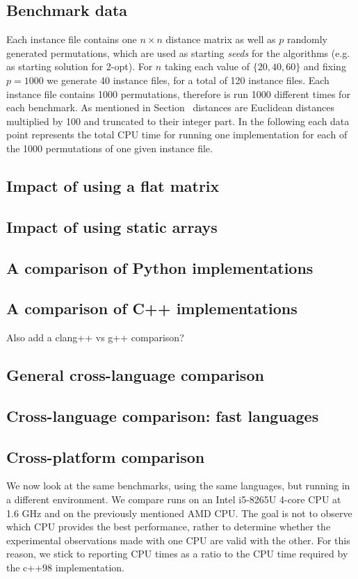 \documentclass[11pt,a4paper,notitlepage]{article}
\begin{document}
\subsection{Benchmark data}
Each instance file contains one $n \times n$ distance matrix as well
as $p$ randomly generated permutations, which are used as starting
\emph{seeds} for the algorithms (e.g. as starting solution for 2-opt).
For $n$ taking each value of $\{20, 40, 60\}$ and fixing $p = 1000$ we
generate 40 instance files, for a total of 120 instance files. Each
instance file contains 1000 permutations, therefore is run 1000
different times for each benchmark. As mentioned in
Section~\label{sec:benchmark} distances are Euclidean distances multiplied
by 100 and truncated to their integer part. In the following each data
point represents the total CPU time for running one implementation
for each of the 1000 permutations of one given instance file.

\subsection{Impact of using a flat matrix}
\subsection{Impact of using static arrays}
\subsection{A comparison of Python implementations}
\subsection{A comparison of C++ implementations}
Also add a clang++ vs g++ comparison?
\subsection{General cross-language comparison}
\subsection{Cross-language comparison: fast languages}

\subsection{Cross-platform comparison}
We now look at the same benchmarks, using the same languages, but running
in a different environment. We compare runs on an Intel i5-8265U
4-core CPU at 1.6 GHz and on the previously mentioned AMD CPU. The
goal is not to observe which CPU provides the best performance, rather
to determine whether the experimental observations made with one CPU
are valid with the other. For this reason, we stick to reporting CPU
times as a ratio to the CPU time required by the c++98 implementation.
\end{document}
